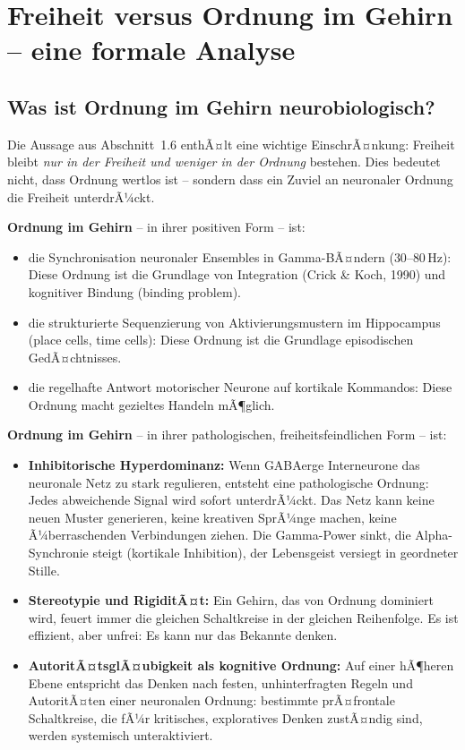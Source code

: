 ﻿\documentclass[12pt,a4paper]{report}
\theoremstyle{plain}
\theoremstyle{definition}
\theoremstyle{remark}
\begin{document}
	\section{Freiheit versus Ordnung im Gehirn -- eine formale Analyse}

	\subsection{Was ist Ordnung im Gehirn neurobiologisch?}

	Die Aussage aus Abschnitt~1.6 enthÃ¤lt eine wichtige EinschrÃ¤nkung:
	Freiheit bleibt \emph{nur in der Freiheit und weniger in der Ordnung}
	bestehen. Dies bedeutet nicht, dass Ordnung wertlos ist --
	sondern dass ein Zuviel an neuronaler Ordnung die Freiheit unterdrÃ¼ckt.

	\textbf{Ordnung im Gehirn} -- in ihrer positiven Form -- ist:
	\begin{itemize}
		\item die Synchronisation neuronaler Ensembles in Gamma-BÃ¤ndern
		($30$--$80$\,Hz): Diese Ordnung ist die Grundlage von Integration
		(Crick \& Koch, 1990) und kognitiver Bindung (binding problem).
		\item die strukturierte Sequenzierung von Aktivierungsmustern
		im Hippocampus (place cells, time cells): Diese Ordnung
		ist die Grundlage episodischen GedÃ¤chtnisses.
		\item die regelhafte Antwort motorischer Neurone auf kortikale
		Kommandos: Diese Ordnung macht gezieltes Handeln mÃ¶glich.
	\end{itemize}

	\textbf{Ordnung im Gehirn} -- in ihrer pathologischen, freiheitsfeindlichen Form -- ist:
	\begin{itemize}
		\item \textbf{Inhibitorische Hyperdominanz:}
		Wenn GABAerge Interneurone das neuronale Netz zu stark regulieren,
		entsteht eine pathologische Ordnung: Jedes abweichende Signal
		wird sofort unterdrÃ¼ckt. Das Netz kann keine neuen Muster
		generieren, keine kreativen SprÃ¼nge machen, keine
		Ã¼berraschenden Verbindungen ziehen. Die Gamma-Power sinkt,
		die Alpha-Synchronie steigt (kortikale Inhibition), der
		Lebensgeist versiegt in geordneter Stille.
		\item \textbf{Stereotypie und RigiditÃ¤t:}
		Ein Gehirn, das von Ordnung dominiert wird, feuert immer
		die gleichen Schaltkreise in der gleichen Reihenfolge.
		Es ist effizient, aber unfrei: Es kann nur das Bekannte denken.
		\item \textbf{AutoritÃ¤tsglÃ¤ubigkeit als kognitive Ordnung:}
		Auf einer hÃ¶heren Ebene entspricht das Denken nach festen,
		un\-hin\-ter\-frag\-ten Regeln und AutoritÃ¤ten einer neuronalen
		Ordnung: bestimmte prÃ¤frontale Schaltkreise, die fÃ¼r
		kritisches, exploratives Denken zustÃ¤ndig sind,
		werden systemisch unteraktiviert.
	\end{itemize}
\end{document}
